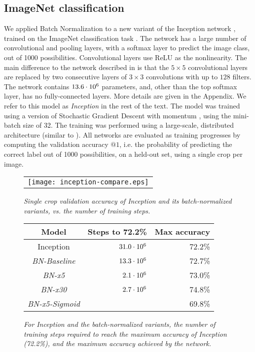\documentclass[twocolumn]{article}
\begin{document}
\subsection{ImageNet classification}
\label{sec-results}

We applied Batch Normalization to a new variant of the Inception network \cite{inception},
trained on the ImageNet classification task \cite{imagenet}. The network has a large
number of convolutional and pooling layers, with a softmax layer to predict the
image class, out of 1000 possibilities. Convolutional layers use ReLU as the
nonlinearity. The main difference to the network described in \cite{inception} is that
the $5\times 5$ convolutional layers are replaced by two consecutive layers of $3\times 3$ convolutions
with up to $128$ filters. The network contains $13.6\cdot 10^6$ parameters, and, other than the top softmax layer, has no fully-connected layers.  More details are given in the Appendix.  We refer to this model as {\sl Inception} in the rest of the text. The model was trained using a version of Stochastic Gradient Descent with momentum
\cite{momentum}, using the mini-batch size of 32. The training was performed using a large-scale, distributed architecture (similar to \cite{dist-belief}).
All networks are evaluated as training progresses by computing the validation accuracy $@1$, i.e. the
probability of predicting the correct label out of 1000 possibilities, on a held-out set, using a single crop per image.

\begin{figure*}
\centering
\begin{minipage}[b]{\columnwidth}
\begin{tabular}{@{}c@{}}
\texttt{[image: inception-compare.eps]}
\end{tabular} 
\caption{\em Single crop validation accuracy of Inception and its
  batch-normalized variants, vs. the number of training steps.  }
\label{fig-inception}
\end{minipage}
\qquad
\begin{minipage}[b]{0.9\columnwidth}
\begin{tabular}{@{} c | r  r  @{}}
\hline
Model & Steps to  72.2\% & Max accuracy \\ 
\hline
Inception& $31.0\cdot 10^6$ & 72.2\%  \\
\sl BN-Baseline& $13.3\cdot 10^6$ & 72.7\%  \\
\sl BN-x5& $2.1\cdot 10^6$ & 73.0\%  \\
\sl BN-x30& $2.7\cdot 10^6$ & 74.8\% \\
\sl BN-x5-Sigmoid&  & 69.8\%\\\hline
\end{tabular}
\caption{\em For Inception and the batch-normalized variants, the number of training steps required to reach the maximum accuracy of Inception (72.2\%), and the maximum accuracy achieved by the network.}
\label{fig-stats}
\end{minipage}
\end{figure*}
\end{document}
